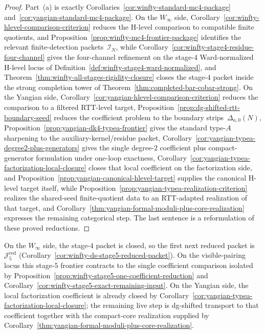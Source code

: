 \begin{proof}
Part~\textup{(a)} is exactly
Corollaries~\ref{cor:winfty-standard-mc4-package}
and~\ref{cor:yangian-standard-mc4-package}. On the
\texorpdfstring{$W_\infty$}{W_infty} side,
Corollary~\ref{cor:winfty-hlevel-comparison-criterion} reduces the
H-level comparison to compatible finite quotients, and
Proposition~\ref{prop:winfty-mc4-frontier-package} identifies the
relevant finite-detection packets~$\mathcal{I}_N$, while
Corollary~\ref{cor:winfty-stage4-residue-four-channel} gives the
four-channel refinement on the stage-$4$ Ward-normalized H-level
locus of Definition~\ref{def:winfty-stage4-ward-normalized}, and
Theorem~\ref{thm:winfty-all-stages-rigidity-closure} closes the
stage-$4$ packet inside the strong completion tower of
Theorem~\ref{thm:completed-bar-cobar-strong}.
On the Yangian side,
Corollary~\ref{cor:yangian-hlevel-comparison-criterion} reduces the
comparison to a filtered RTT-level target,
Proposition~\ref{prop:dg-shifted-rtt-boundary-seed} reduces the
coefficient problem to the boundary strips~$\Delta_{a,0}(N)$,
Proposition~\ref{prop:yangian-dk4-typea-frontier} gives the standard
type-$A$ sharpening to the auxiliary-kernel/residue packet,
Corollary~\ref{cor:yangian-typea-degree2-plus-generators} gives the
single degree-$2$ coefficient plus compact-generator formulation under
one-loop exactness,
Corollary~\ref{cor:yangian-typea-factorization-local-closure} closes
that local coefficient on the factorization side, and
Proposition~\ref{prop:yangian-canonical-hlevel-target} supplies the
canonical H-level target itself, while
Proposition~\ref{prop:yangian-typea-realization-criterion} realizes the
shared-seed finite-quotient data to an RTT-adapted realization of that
target, and
Corollary~\ref{thm:yangian-formal-moduli-plus-core-realization}
expresses the remaining categorical step. The last sentence is a
reformulation of these proved reductions.
\end{proof}

\begin{remark}
On the \texorpdfstring{$W_\infty$}{W_infty} side, the stage-$4$
packet is closed, so the first next reduced packet is
$\mathcal{J}_5^{\mathrm{red}}$
\textup{(}Corollary~\textup{\ref{cor:winfty-ds-stage5-reduced-packet}}\textup{)}.
On the visible-pairing locus this stage-$5$ frontier contracts to the
single coefficient comparison isolated by
Proposition~\ref{prop:winfty-stage5-one-coefficient-reduction} and
Corollary~\ref{cor:winfty-stage5-exact-remaining-input}. On the
Yangian side, the local factorization coefficient is already closed by
Corollary~\ref{cor:yangian-typea-factorization-local-closure}; the
remaining live step is dg-shifted transport to that coefficient
together with the compact-core realization supplied by
Corollary~\ref{thm:yangian-formal-moduli-plus-core-realization}.
\end{remark}


